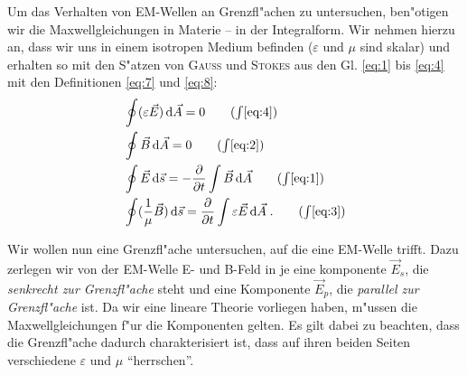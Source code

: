 \documentclass[twoside,a4paper]{book}
\newcommand{\diff}{\ensuremath{\, \mathrm{d}}}
\begin{document}
Um das Verhalten von EM-Wellen an Grenzfl"achen zu untersuchen,
ben"otigen wir die Maxwellgleichungen in Materie -- in der
Integralform. Wir nehmen hierzu an, dass wir uns in einem isotropen
Medium befinden ($\varepsilon$ und $\mu$ sind skalar) und erhalten so
mit den S"atzen von \textsc{Gauss} und \textsc{Stokes} aus den
Gl. \eqref{eq:1} bis \eqref{eq:4} mit den Definitionen \eqref{eq:7}
und \eqref{eq:8}:
\begin{align}
\label{eqn_maxwell_materie_1}
&\oint (\varepsilon \vec E) \diff \vec A = 0 \tag{$\int$\ref{eq:4}}\\
\label{eqn_maxwell_materie_2}
&\oint \vec B \diff \vec A = 0 \tag{$\int$\ref{eq:2}} \\
\label{eqn_maxwell_materie_3}
&\oint \vec E \diff \vec s = -\frac{\partial }{\partial t}\int \vec B
\diff \vec A \tag{$\int$\ref{eq:1}}\\
\label{eqn_maxwell_materie_4}
&\oint (\frac{1}{\mu} \vec B) \diff \vec s = \frac{\partial }{\partial t}
\int \varepsilon \vec E \diff \vec A  \;.  \tag{$\int$\ref{eq:3}}
\end{align}

Wir wollen nun eine Grenzfl"ache untersuchen, auf die eine EM-Welle
trifft. Dazu zerlegen wir von der EM-Welle E- und B-Feld in je eine
komponente $\vec E_s$, die \emph{senkrecht zur Grenzfl"ache} steht und
eine Komponente $\vec E_p$, die \emph{parallel zur Grenzfl"ache}
ist. Da wir eine lineare Theorie vorliegen haben, m"ussen die
Maxwellgleichungen f"ur die Komponenten gelten. Es gilt dabei zu
beachten, dass die Grenzfl"ache dadurch
charakterisiert ist, dass auf ihren beiden Seiten verschiedene
$\varepsilon$ und $\mu$ "`herrschen"'.
\end{document}
